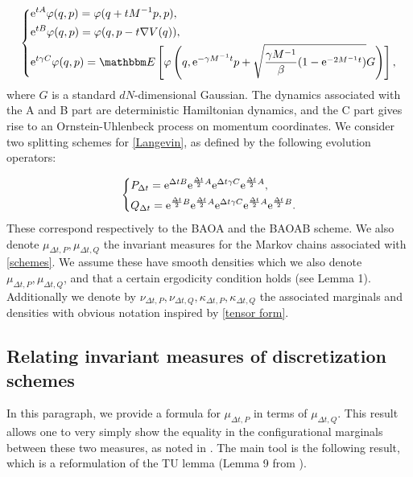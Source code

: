 \begin{equation}
  \label{propagators}
  \left\{\begin{aligned}
    &\mathrm{e}^{tA}\varphi(q,p)=\varphi(q+tM^{-1}p,p),\\
    &\mathrm{e}^{tB}\varphi(q,p)=\varphi(q,p-t\nabla V(q)),\\
   &\mathrm{e}^{t\gamma C}\varphi(q,p)=\mathbbm E \left[\varphi \left(q, \mathrm e^{-\gamma M^{-1}t}p + \sqrt{\frac{\gamma M^{-1}}{\beta}(1-\mathrm{e}^{-2M^{-1}t})}G\right)\right],
\end{aligned}\right.
\end{equation}
where $G$ is a standard $dN$-dimensional Gaussian. The dynamics associated with the A and B part are deterministic Hamiltonian dynamics, and the C part gives rise to an Ornstein-Uhlenbeck process on momentum coordinates. We consider two splitting schemes for \eqref{Langevin}, as defined by the following evolution operators:

\begin{equation}
  \label{schemes}
  \left\{\begin{aligned}
    &P_{\Delta t}=\mathrm{e}^{\Delta t B}\mathrm{e}^{\frac{\Delta t}2A}\mathrm{e}^{\Delta t \gamma C}\mathrm{e}^{\frac{\Delta t}2A},\\
    &Q_{\Delta t}=\mathrm{e}^{\frac{\Delta t}2B}\mathrm{e}^{\frac{\Delta t}2A}\mathrm{e}^{\Delta t \gamma C}\mathrm{e}^{\frac{\Delta t}2A}\mathrm{e}^{\frac{\Delta t}2B}.\\
\end{aligned}\right.
\end{equation}
These correspond respectively to the BAOA and the BAOAB scheme.
We also denote $\mu_{\Delta t,P}, \mu_{\Delta t, Q}$ the invariant measures for the Markov chains associated with \eqref{schemes}. We assume these have smooth densities which we also denote $\mu_{\Delta t,P}, \mu_{\Delta t,Q}$, and that a certain ergodicity condition holds (see Lemma 1).
Additionally we denote by $\nu_{\Delta t,P},\nu_{\Delta t,Q},\kappa_{\Delta t,P},\kappa_{\Delta t,Q}$ the associated marginals and densities with obvious notation inspired by \eqref{tensor form}.


\subsection{Relating invariant measures of discretization schemes}\label{relating invariant measures}
In this paragraph, we provide a formula for $\mu_{\Delta t,P}$ in terms of $\mu_{\Delta t,Q}$. This result allows one to very simply show the equality in the configurational marginals between these two measures, as noted in \cite{KK22}.
The main tool is the following result, which is a reformulation of the TU lemma (Lemma 9 from \cite{LMS13}).

